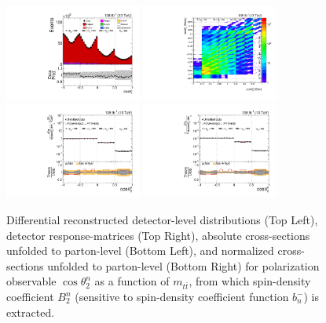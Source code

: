 \clearpage
\begin{figure}[htb]
\begin{center}
 \includegraphics[width=0.40\textwidth]{fig_fullRun2UL/controlplots/combined/Hyp_LeptonBn_vs_TTBarMass.pdf}
 \includegraphics[width=0.40\textwidth]{fig_fullRun2UL/unfolding/combined/ResponseMatrix_b2n_mttbar.pdf} \\
 \includegraphics[width=0.40\textwidth]{fig_fullRun2UL/unfolding/combined/UnfoldedResults_b2n_mttbar.pdf}
 \includegraphics[width=0.40\textwidth]{fig_fullRun2UL/unfolding/combined/UnfoldedResultsNorm_b2n_mttbar.pdf} \\
\label{fig:b2n_mttbar}
\caption{Differential reconstructed detector-level distributions (Top Left), detector response-matrices (Top Right), absolute cross-sections unfolded to parton-level (Bottom Left), and normalized cross-sections unfolded to parton-level (Bottom Right) for polarization observable $\cos\theta_{2}^{n}$ as a function of $m_{t\bar{t}}$, from which spin-density coefficient $B_{2}^{n}$ (sensitive to spin-density coefficient function $b_n^{-}$) is extracted.}
\end{center}
\end{figure}
